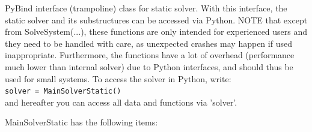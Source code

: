 \label{sec:MainSolverStatic}
PyBind interface (trampoline) class for static solver. With this interface, the static solver and its substructures can be accessed via Python. NOTE that except from SolveSystem(...), these functions are only intended for experienced users and they need to be handled with care, as unexpected crashes may happen if used inappropriate. Furthermore, the functions have a lot of overhead (performance much lower than internal solver) due to Python interfaces, and should thus be used for small systems. To access the solver in Python, write: \\ 
 \texttt{solver = MainSolverStatic()} \\ 
and hereafter you can access all data and functions via 'solver'.

\noindent MainSolverStatic has the following items:
